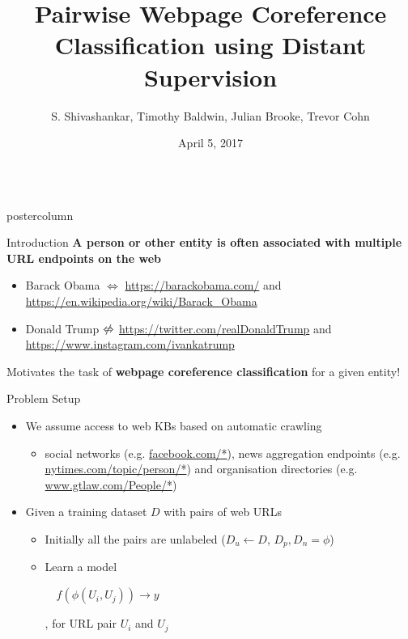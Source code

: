 \documentclass{beamer}
\title{\huge Pairwise Webpage Coreference Classification using Distant Supervision}
\author{S. Shivashankar, Timothy Baldwin, Julian Brooke, Trevor Cohn}
\institute[The University of Melbourne]{Computing and Information Systems, The University of Melbourne, Australia}
\date{April 5, 2017}
\newlength{\columnheight}
\begin{document}
\begin{frame}
\begin{columns}
	\begin{column}{.5\textwidth}
		\begin{beamercolorbox}[center]{postercolumn}
			\begin{minipage}{.98\textwidth}  %
				\parbox[t][\columnheight]{\textwidth}{ %
					\begin{myblock}{Introduction}
						\textbf{A person or other entity is often associated with multiple URL endpoints on the web}
						\vspace{0.5em}
			               \begin{itemize}
			                \item { \color{gray} Barack Obama} $\Leftrightarrow$ {\color{blue} \small \url{https://barackobama.com/}} and {\color{blue} \small \url{https://en.wikipedia.org/wiki/Barack_Obama}}
					\item { \color{gray} Donald Trump} $\centernot\Leftrightarrow$ {\color{blue} \small \url{https://twitter.com/realDonaldTrump}} and {\color{blue}  \small \url{https://www.instagram.com/ivankatrump}}
			                \end{itemize}
	              {\color{cyan} Motivates the task of  \textbf{webpage coreference classification} for a given entity!}
    				\end{myblock}\vfill
					\begin{myblock}{Problem Setup}
						\vspace{0.5em}
	 \begin{itemize}
	\item We assume access to web KBs based on automatic crawling
	\begin{itemize}
	 \item social networks (e.g. {\color{blue} \url{facebook.com/*})}, news aggregation endpoints (e.g. {\color{blue} \url{nytimes.com/topic/person/*}}) and organisation directories (e.g.  {\color{blue} \url{www.gtlaw.com/People/*}})
	\end{itemize}     	
\item  Given a training dataset $D$ with pairs of web URLs 
         \begin{itemize}
\item Initially all the pairs are unlabeled ($D_{u} \leftarrow D$, $D_{p}, D_{n} = \phi$)
\item Learn a model \begin{small} $\quad f(\phi(U_{i}, U_{j})) \to y$ \end{small}, for URL pair $U_{i}$ and $U_{j}$

\end{itemize}
\end{itemize}
\end{myblock}}
\end{minipage}
\end{beamercolorbox}
\end{column}
\end{columns}
\end{frame}
\end{document}
